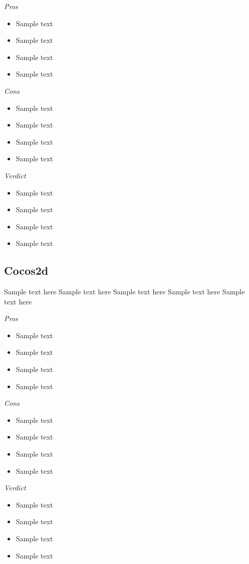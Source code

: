 \documentclass[11pt]{article}
\begin{document}
\emph{Pros}
\begin{itemize}
  \setlength{\itemsep}{0mm}  
  \item Sample text
  \item Sample text
  \item Sample text
  \item Sample text
\end{itemize}
\par
\emph{Cons}
\begin{itemize}
  \setlength{\itemsep}{0mm}  
  \item Sample text
  \item Sample text
  \item Sample text
  \item Sample text
\end{itemize}
\par
\emph{Verdict}
\begin{itemize}
  \setlength{\itemsep}{0mm}  
  \item Sample text
  \item Sample text
  \item Sample text
  \item Sample text
\end{itemize}


\subsection{Cocos2d}

Sample text here
Sample text here
Sample text here
Sample text here
Sample text here \par

\emph{Pros}
\begin{itemize}
  \setlength{\itemsep}{0mm}  
  \item Sample text
  \item Sample text
  \item Sample text
  \item Sample text
\end{itemize}
\par
\emph{Cons}
\begin{itemize}
  \setlength{\itemsep}{0mm}  
  \item Sample text
  \item Sample text
  \item Sample text
  \item Sample text
\end{itemize}
\par
\emph{Verdict}
\begin{itemize}
  \setlength{\itemsep}{0mm}  
  \item Sample text
  \item Sample text
  \item Sample text
  \item Sample text
\end{itemize}
\end{document}

